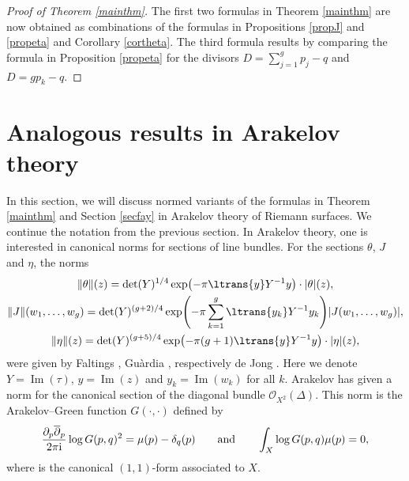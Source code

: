 \documentclass[10pt,a4paper]{amsart}
\numberwithin{equation}{section}
\begin{document}
\begin{proof}[Proof of Theorem \ref{mainthm}]
	The first two formulas in Theorem \ref{mainthm} are now obtained as combinations of the formulas in Propositions \ref{propJ} and \ref{propeta} and Corollary \ref{cortheta}. The third formula results by comparing the formula in Proposition \ref{propeta} for the divisors $D=\sum_{j=1}^g p_j-q$ and $D=gp_k-q$.
\end{proof}


\section{Analogous results in Arakelov theory}\label{secarakelov}
In this section, we will discuss normed variants of the formulas in Theorem \ref{mainthm} and Section \ref{secfay} in Arakelov theory of Riemann surfaces. We continue the notation from the previous section.
In Arakelov theory, one is interested in canonical norms for sections of line bundles. For the sections $\theta$, $J$ and $\eta$, the norms
\begin{gather*}
\|\theta\|(z)=\det(Y)^{1/4}\exp\bigl(-\pi\ltrans{y}Y^{-1}y\bigr)\cdot |\theta|(z),\\
\|J\|(w_{1},\dots,w_{g})=\det(Y)^{(g+2)/4}\exp\Biggl(-\pi\sum_{k=1}^{g}\ltrans{y_{k}}Y^{-1}y_{k}\Biggr)|J(w_{1},\dots,w_{g})|,\\
\|\eta\|(z)=\det(Y)^{(g+5)/4}\exp\bigl(-\pi(g+1)\ltrans{y}Y^{-1}y\bigr)\cdot|\eta|(z),
\end{gather*}
were given by Faltings \cite[p.~401]{Fal84}, Gu\`ardia \cite[Definition 2.1]{Gua99}, respectively de Jong \cite[Section~2]{dJo08}. Here we denote $Y=\operatorname{Im}(\tau)$, $y=\operatorname{Im}(z)$ and $y_k=\operatorname{Im}(w_k)$ for all $k$.
Arakelov \cite{Ara74} has given a norm for the canonical section of the diagonal bundle $\mathcal{O}_{X^2}(\Delta)$. This norm is the Arakelov--Green function $G(\cdot,\cdot)$ defined by
\[\frac{\partial_{p}\overline{\partial}_{p}}{2\pi {\rm i}}\log G(p,q)^2=\mu(p)-\delta_q(p)\qquad\text{and}\qquad \int_{X}\log G(p,q)\mu(p)=0,\]
where  is the canonical $(1,1)$-form associated to $X$.
\end{document}
